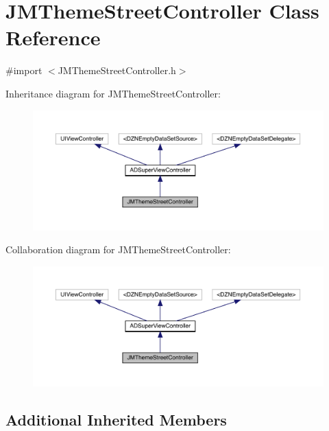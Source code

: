 \hypertarget{interface_j_m_theme_street_controller}{}\section{J\+M\+Theme\+Street\+Controller Class Reference}
\label{interface_j_m_theme_street_controller}


{\ttfamily \#import $<$J\+M\+Theme\+Street\+Controller.\+h$>$}



Inheritance diagram for J\+M\+Theme\+Street\+Controller\+:\nopagebreak
\begin{figure}[H]
\begin{center}
\leavevmode
\includegraphics[width=350pt]{interface_j_m_theme_street_controller__inherit__graph}
\end{center}
\end{figure}


Collaboration diagram for J\+M\+Theme\+Street\+Controller\+:\nopagebreak
\begin{figure}[H]
\begin{center}
\leavevmode
\includegraphics[width=350pt]{interface_j_m_theme_street_controller__coll__graph}
\end{center}
\end{figure}
\subsection*{Additional Inherited Members}


